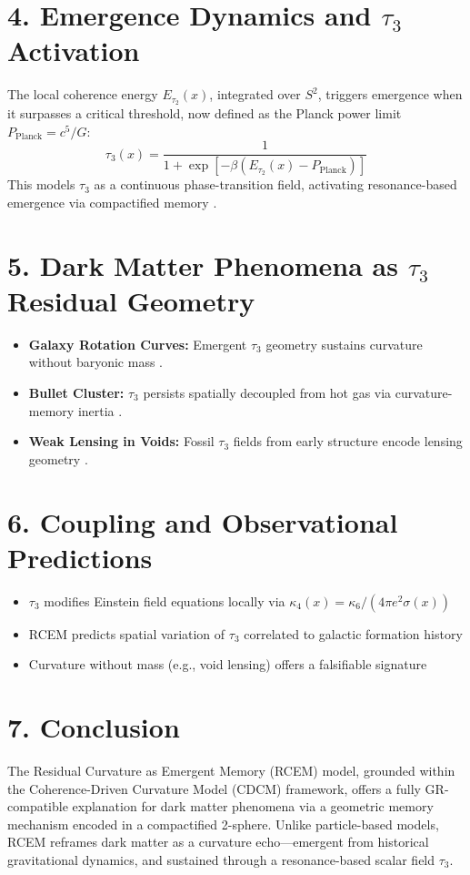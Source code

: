 \documentclass[12pt]{article}
\begin{document}
\section*{4. Emergence Dynamics and $\tau_3$ Activation}
The local coherence energy $E_{\tau_2}(x)$, integrated over $S^2$, triggers emergence when it surpasses a critical threshold, now defined as the Planck power limit $P_\text{Planck} = c^5/G$:
\[
\tau_3(x) = \frac{1}{1 + \exp[-\beta(E_{\tau_2}(x) - P_\text{Planck})]}
\]
This models $\tau_3$ as a continuous phase-transition field, activating resonance-based emergence via compactified memory \cite{fortes2025a,fortes2025b}.

\section*{5. Dark Matter Phenomena as $\tau_3$ Residual Geometry}
\begin{itemize}
    \item \textbf{Galaxy Rotation Curves:} Emergent $\tau_3$ geometry sustains curvature without baryonic mass \cite{rubin1970,sofue2001}.
    \item \textbf{Bullet Cluster:} $\tau_3$ persists spatially decoupled from hot gas via curvature-memory inertia \cite{clowe2006}.
    \item \textbf{Weak Lensing in Voids:} Fossil $\tau_3$ fields from early structure encode lensing geometry \cite{massey2007}.
\end{itemize}

\section*{6. Coupling and Observational Predictions}
\begin{itemize}
    \item $\tau_3$ modifies Einstein field equations locally via $\kappa_4(x) = \kappa_6 / (4\pi e^2 \sigma(x))$ \cite{fortes2025b}
    \item RCEM predicts spatial variation of $\tau_3$ correlated to galactic formation history
    \item Curvature without mass (e.g., void lensing) offers a falsifiable signature
\end{itemize}

\section*{7. Conclusion}
The Residual Curvature as Emergent Memory (RCEM) model, grounded within the Coherence-Driven Curvature Model (CDCM) framework, offers a fully GR-compatible explanation for dark matter phenomena via a geometric memory mechanism encoded in a compactified 2-sphere. Unlike particle-based models, RCEM reframes dark matter as a curvature echo—emergent from historical gravitational dynamics, and sustained through a resonance-based scalar field $\tau_3$.
\end{document}
